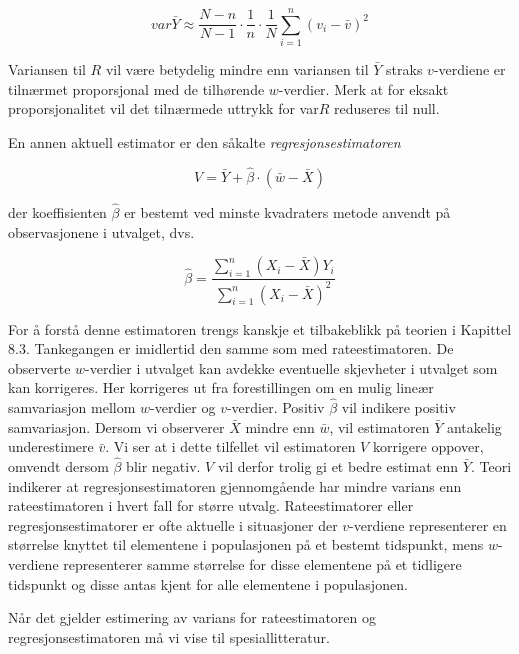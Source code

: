 \[ var\bar{Y} \approx \frac{N-n}{N-1} \cdot \frac{1}{n} \cdot \frac{1}{N}
                       \sum_{i=1}^n{(v_i-\bar{v})}^2 \]

\noindent Variansen til $R$ vil være betydelig mindre enn variansen til
 $\bar{Y}$ straks $v$-verdiene er tilnærmet proporsjonal med de
 tilhørende $w$-verdier.  Merk at for eksakt proporsjonalitet vil det
 tilnærmede uttrykk for var$R$ reduseres til null.

En annen aktuell estimator er den såkalte {\em regresjonsestimatoren}

\[ V=\bar{Y}+\hat{\beta} \cdot (\bar{w}-\bar{X})       \]

\noindent der koeffisienten $\hat{\beta}$ er bestemt ved minste kvadraters
 metode anvendt på observasjonene i utvalget, dvs.

\[  \hat{\beta}=\frac{\sum_{i=1}^{n}(X_i-\bar{X})Y_i}
                          {\sum_{i=1}^{n}{(X_i-\bar{X})}^2} \]

\noindent For å forstå denne estimatoren trengs kanskje et
tilbakeblikk på teorien i Kapittel 8.3.  Tankegangen er imidlertid den
samme som med rateestimatoren.  De observerte $w$-verdier i utvalget kan
avdekke eventuelle skjevheter i utvalget som kan korrigeres.  Her korrigeres
ut fra forestillingen om en mulig lineær samvariasjon mellom $w$-verdier
og $v$-verdier.  Positiv $\hat{\beta}$ vil indikere positiv samvariasjon.  
Dersom vi observerer $\bar{X}$ mindre enn $\bar{w}$, vil estimatoren 
$\bar{Y}$ antakelig underestimere $\bar{v}$.  Vi ser at i dette tilfellet
vil estimatoren $V$ korrigere oppover, omvendt dersom $\hat{\beta}$ blir
negativ.  $V$ vil derfor trolig gi et bedre estimat enn $\bar{Y}$.  Teori
indikerer at regresjonsestimatoren gjennomgående har mindre varians enn
rateestimatoren i hvert fall for større utvalg.  Rateestimatorer eller
regresjonsestimatorer er ofte aktuelle i situasjoner der $v$-verdiene
representerer en størrelse knyttet til elementene i populasjonen på
et bestemt tidspunkt, mens $w$-verdiene representerer samme størrelse
for disse elementene på et tidligere tidspunkt og disse antas kjent for
alle elementene i populasjonen.

Når det gjelder estimering av varians for rateestimatoren og 
regresjonsestimatoren må vi vise til spesiallitteratur. \\

